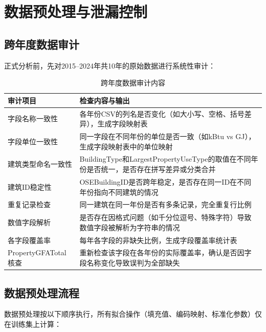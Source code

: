 \section{数据预处理与泄漏控制}

\subsection{跨年度数据审计}

正式分析前，先对2015--2024年共10年的原始数据进行系统性审计：

\begin{table}[H]
\centering
\caption{跨年度数据审计内容}
\label{tab:audit}
\begin{tabular}{p{3.5cm}p{8.5cm}}
\hline
\textbf{审计项目} & \textbf{检查内容与输出} \\
\hline
字段名称一致性 & 各年份CSV的列名是否变化（如大小写、空格、括号差异），生成字段映射表 \\
\hline
字段单位一致性 & 同一字段在不同年份的单位是否一致（如kBtu vs GJ），生成字段映射表中的单位映射 \\
\hline
建筑类型命名一致性 & BuildingType和LargestPropertyUseType的取值在不同年份是否统一，是否存在拼写差异或分类合并 \\
\hline
建筑ID稳定性 & OSEBuildingID是否跨年稳定，是否存在同一ID在不同年份指向不同建筑的情况 \\
\hline
重复记录检查 & 同一建筑在同一年份是否有多条记录，完全重复行比例 \\
\hline
数值字段解析 & 是否存在因格式问题（如千分位逗号、特殊字符）导致数值字段被解析为字符串的情况 \\
\hline
各字段覆盖率 & 每年各字段的非缺失比例，生成字段覆盖率统计表 \\
\hline
PropertyGFATotal核查 & 重新检查该字段在各年份的实际覆盖率，确认是否因字段名称变化导致误判为全部缺失 \\
\hline
\end{tabular}
\end{table}

\subsection{数据预处理流程}

数据预处理按以下顺序执行，所有拟合操作（填充值、编码映射、标准化参数）仅在训练集上计算：

